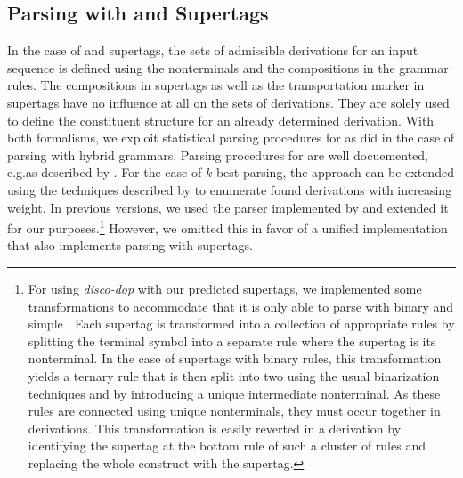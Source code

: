 \documentclass[../document.tex]{subfiles}
\begin{document}
    \subsection{Parsing with  and  Supertags}\label{sec:parsing:lcfrs}
    In the case of  and  supertags, the sets of admissible derivations for an input sequence is defined using the nonterminals and the  compositions in the grammar rules.
    The  compositions in  supertags as well as the transportation marker in  supertags have no influence at all on the sets of derivations.
    They are solely used to define the constituent structure for an already determined derivation.
    With both formalisms, we exploit statistical parsing procedures for  as \citet{Geb20} did in the case of parsing with hybrid grammars.
    Parsing procedures for  are well docuemented, e.g.\@ as described by \citet[Section 7.1]{Kal10}.
    For the case of \(k\) best parsing, the approach can be extended using the techniques described by \citet{HuaChia05} to enumerate found derivations with increasing weight.
    In previous versions, we used the  parser implemented by \citet{CraSchBod16} and extended it for our purposes.\footnote{
        For using \emph{disco-dop} with our predicted supertags, we implemented some transformations to accommodate that it is only able to parse with binary and simple .
        Each supertag is transformed into a collection of appropriate rules by splitting the terminal symbol into a separate rule where the supertag is its  nonterminal.
        In the case of supertags with binary rules, this transformation yields a ternary rule that is then split into two using the usual binarization techniques and by introducing a unique intermediate nonterminal.
        As these rules are connected using unique nonterminals, they must occur together in derivations.
        This transformation is easily reverted in a derivation by identifying the supertag at the bottom rule of such a cluster of rules and replacing the whole construct with the supertag.
    }
    However, we omitted this in favor of a unified implementation that also implements parsing with  supertags.
\end{document}
